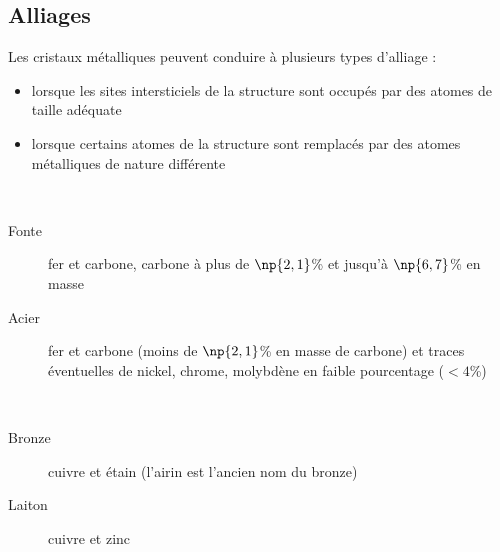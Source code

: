 \subsection*{Alliages}
Les cristaux métalliques peuvent conduire à plusieurs types
d'alliage :
\begin{itemize}
    \item lorsque les sites intersticiels de la structure sont
        occupés par des atomes de taille adéquate
    \item lorsque certains atomes de la structure sont remplacés
        par des atomes métalliques de nature différente
\end{itemize}
\begin{ex}~\\
    \begin{description}
        \item[Fonte] fer et carbone, carbone à plus de $\np{2,1}$\%
            et jusqu'à $\np{6,7}$\% en masse
        \item[Acier] fer et carbone (moins de $\np{2,1}$\% en masse
            de carbone) et traces éventuelles de nickel, chrome,
            molybdène en faible pourcentage ($<4$\%)
    \end{description}
\end{ex}
\begin{ex}~\\
    \begin{description}
        \item[Bronze] cuivre et étain (l'airin est l'ancien nom
            du bronze)
        \item[Laiton] cuivre et zinc
    \end{description}
\end{ex}
